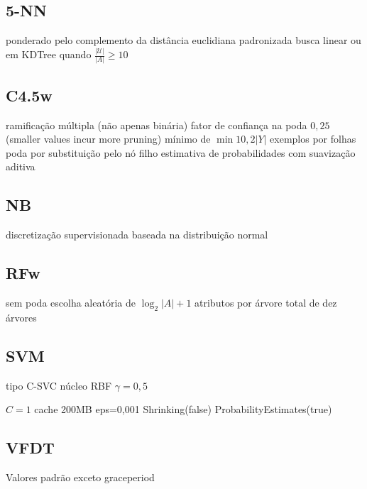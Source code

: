 \subsection{5-NN}
ponderado pelo complemento da distância euclidiana padronizada 
busca linear ou em KDTree quando $\frac{|\mathcal{U}|}{|A|}\geq10$

\subsection{C4.5w}
ramificação múltipla (não apenas binária)
fator de confiança na poda $0,25$ (smaller values incur more pruning)
mínimo de $\min{10, 2|Y|}$ exemplos por folhas
poda por substituição pelo nó filho
estimativa de probabilidades com suavização aditiva \cite{books/daglib/0021593}

\subsection{NB}
discretização supervisionada baseada na distribuição normal

\subsection{RFw}
sem poda
escolha aleatória de $\log_2|A| + 1$ atributos por árvore
total de dez árvores

\subsection{SVM}
tipo C-SVC \citep{journals/ml/CortesV95}
núcleo RBF
$\gamma=0,5$ %

$C=1$ %
cache 200MB
eps=0,001 %
Shrinking(false)
ProbabilityEstimates(true)


\subsection{VFDT}
Valores padrão exceto  graceperiod

